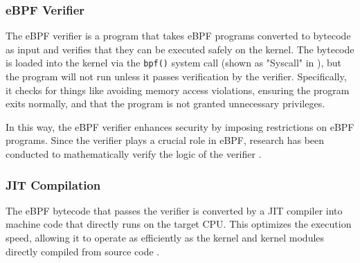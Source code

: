 \subsubsection{eBPF Verifier}
The eBPF verifier is a program that takes eBPF programs converted to bytecode as input and
verifies that they can be executed safely on the kernel.
The bytecode is loaded into the kernel via the \texttt{bpf()} system call
(shown as "Syscall" in ), but the program will not run unless it passes verification by the verifier.
Specifically, it checks for things like avoiding memory access violations, ensuring the program exits normally,
and that the program is not granted unnecessary privileges.

In this way, the eBPF verifier enhances security by imposing restrictions on eBPF programs.
Since the verifier plays a crucial role in eBPF,
research has been conducted to mathematically verify the logic of the verifier \cite{vishwanathan2023verifying}.

\subsubsection{JIT Compilation}
The eBPF bytecode that passes the verifier is converted by a JIT compiler into machine code
that directly runs on the target CPU. This optimizes the execution speed, allowing it
to operate as efficiently as the kernel and kernel modules directly compiled from source code
\cite{WhatiseB29:online}.
